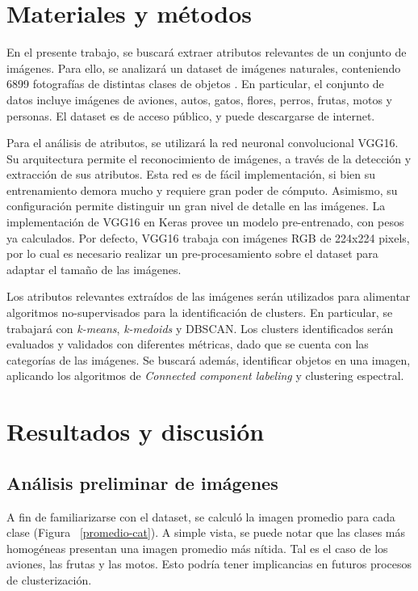 \documentclass[journal,article,submit,pdftex,moreauthors]{Definitions/mdpi}
\begin{document}
\section{Materiales y métodos}

En el presente trabajo, se buscará extraer atributos relevantes de un conjunto de imágenes. Para ello, se analizará un dataset de imágenes naturales, conteniendo 6899 fotografías de distintas clases de objetos \cite{ref-kaggle}. En particular, el conjunto de datos incluye imágenes de aviones, autos, gatos, flores, perros, frutas, motos y personas. El dataset es de acceso público, y puede descargarse de internet.

Para el análisis de atributos, se utilizará la red neuronal convolucional VGG16. Su arquitectura permite el reconocimiento de imágenes, a través de la detección y extracción de sus atributos. Esta red es de fácil implementación, si bien su entrenamiento demora mucho y requiere gran poder de cómputo. Asimismo, su configuración permite distinguir un gran nivel de detalle en las imágenes. La implementación de VGG16 en Keras provee un modelo pre-entrenado, con pesos ya calculados. Por defecto, VGG16 trabaja con imágenes RGB de 224x224 pixels, por lo cual es necesario realizar un pre-procesamiento sobre el dataset para adaptar el tamaño de las imágenes. 

Los atributos relevantes extraídos de las imágenes serán utilizados para alimentar algoritmos no-supervisados para la identificación de clusters. En particular, se trabajará con \textit{k-means}, \textit{k-medoids} y DBSCAN. Los clusters identificados serán evaluados y validados con diferentes métricas, dado que se cuenta con las categorías de las imágenes. Se buscará además, identificar objetos en una imagen, aplicando los algoritmos de \textit{Connected component labeling} y clustering espectral.

\section{Resultados y discusión}

\subsection{Análisis preliminar de imágenes} \label{preliminar}

A fin de familiarizarse con el dataset, se calculó la imagen promedio para cada clase (Figura ~\ref{promedio-cat}). A simple vista, se puede notar que las clases más homogéneas presentan una imagen promedio más nítida. Tal es el caso de los aviones, las frutas y las motos. Esto podría tener implicancias en futuros procesos de clusterización.
\end{document}
